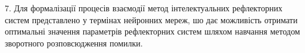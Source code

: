 7. Для формалізації процесів взаємодії метод інтелектуальних рефлекторних систем представлено у термінах нейронних мереж, шо дає можливість отримати оптимальні значення параметрів рефлекторних систем шляхом навчання методом зворотного розповсюдження помилки.

